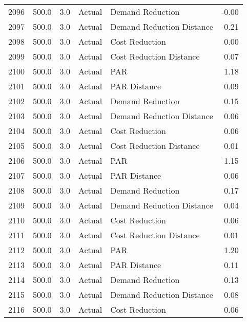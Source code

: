 \begin{longtable}{lrrllr}
2096 &        500.0 &     3.0 &         Actual &           Demand Reduction &  -0.00 \\
2097 &        500.0 &     3.0 &         Actual &  Demand Reduction Distance &   0.21 \\
2098 &        500.0 &     3.0 &         Actual &             Cost Reduction &   0.00 \\
2099 &        500.0 &     3.0 &         Actual &    Cost Reduction Distance &   0.07 \\
2100 &        500.0 &     3.0 &         Actual &                        PAR &   1.18 \\
2101 &        500.0 &     3.0 &         Actual &               PAR Distance &   0.09 \\
2102 &        500.0 &     3.0 &         Actual &           Demand Reduction &   0.15 \\
2103 &        500.0 &     3.0 &         Actual &  Demand Reduction Distance &   0.06 \\
2104 &        500.0 &     3.0 &         Actual &             Cost Reduction &   0.06 \\
2105 &        500.0 &     3.0 &         Actual &    Cost Reduction Distance &   0.01 \\
2106 &        500.0 &     3.0 &         Actual &                        PAR &   1.15 \\
2107 &        500.0 &     3.0 &         Actual &               PAR Distance &   0.06 \\
2108 &        500.0 &     3.0 &         Actual &           Demand Reduction &   0.17 \\
2109 &        500.0 &     3.0 &         Actual &  Demand Reduction Distance &   0.04 \\
2110 &        500.0 &     3.0 &         Actual &             Cost Reduction &   0.06 \\
2111 &        500.0 &     3.0 &         Actual &    Cost Reduction Distance &   0.01 \\
2112 &        500.0 &     3.0 &         Actual &                        PAR &   1.20 \\
2113 &        500.0 &     3.0 &         Actual &               PAR Distance &   0.11 \\
2114 &        500.0 &     3.0 &         Actual &           Demand Reduction &   0.13 \\
2115 &        500.0 &     3.0 &         Actual &  Demand Reduction Distance &   0.08 \\
2116 &        500.0 &     3.0 &         Actual &             Cost Reduction &   0.06 \\

\end{longtable}
